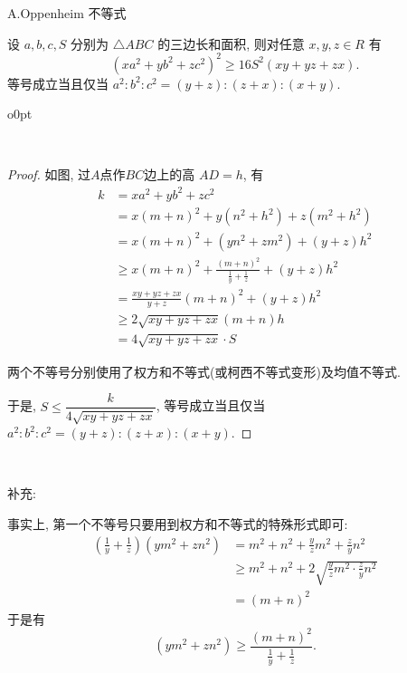 \noindent A.Oppenheim 不等式

设 $a,b,c,S$ 分别为 $\triangle ABC$ 的三边长和面积, 则对任意 $x,y,z\in R$ 有
\[(xa^2+yb^2+zc^2)^2 \ge 16S^2(xy+yz+zx) .\]
等号成立当且仅当 $a^2:b^2:c^2=(y+z):(z+x):(x+y)$.

\begin{wrapfigure}[4]{o}{0pt}
\end{wrapfigure}
~

\begin{proof}
如图, 过$A$点作$BC$边上的高 $AD=h$, 有
\begin{align*}
 k&=xa^2+yb^2+zc^2\\
&=x(m+n)^2+y(n^2+h^2)+z(m^2+h^2)\\
&=x(m+n)^2+(yn^2+zm^2)+(y+z)h^2\\
&\ge x(m+n)^2+\frac{(m+n)^2}{\frac{1}{y}+\frac{1}{z}}+(y+z)h^2\\
&= \frac{xy+yz+zx}{y+z}(m+n)^2+(y+z)h^2\\
&\ge 2\sqrt{xy+yz+zx}(m+n)h\\
&=4\sqrt{xy+yz+zx}\cdot S
\end{align*}

两个不等号分别使用了权方和不等式(或柯西不等式变形)及均值不等式.

于是, $S\le \dfrac{k}{4\sqrt{xy+yz+zx}}$, 等号成立当且仅当 $a^2:b^2:c^2=(y+z):(z+x):(x+y)$.
\end{proof}

~

\noindent 补充:

事实上, 第一个不等号只要用到权方和不等式的特殊形式即可: 
\begin{align*}
\left(\frac{1}{y}+\frac{1}{z}\right)(ym^2+zn^2) &= m^2 + n^2 + \frac{y}{z}m^2 + \frac{z}{y}n^2\\
&\ge m^2+n^2 + 2\sqrt{\frac{y}{z}m^2\cdot\frac{z}{y}n^2}\\
&=(m+n)^2
\end{align*}
于是有 
\[
(ym^2+zn^2) \ge \frac{(m+n)^2}{\frac{1}{y}+\frac{1}{z}}.
\]

